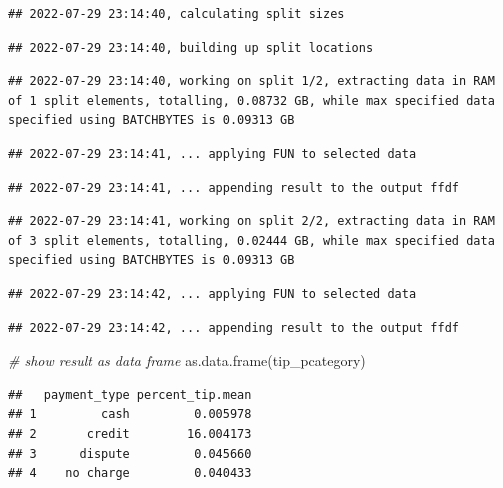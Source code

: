 \documentclass[
  12pt,
]{style/krantz}
\newenvironment{Shaded}{\begin{snugshade}}{\end{snugshade}}
\newcommand{\CommentTok}[1]{\textcolor[rgb]{0.56,0.35,0.01}{\textit{#1}}}
\newcommand{\FunctionTok}[1]{\textcolor[rgb]{0.00,0.00,0.00}{#1}}
\newcommand{\NormalTok}[1]{#1}
\begin{document}
\begin{verbatim}
## 2022-07-29 23:14:40, calculating split sizes
\end{verbatim}

\begin{verbatim}
## 2022-07-29 23:14:40, building up split locations
\end{verbatim}

\begin{verbatim}
## 2022-07-29 23:14:40, working on split 1/2, extracting data in RAM of 1 split elements, totalling, 0.08732 GB, while max specified data specified using BATCHBYTES is 0.09313 GB
\end{verbatim}

\begin{verbatim}
## 2022-07-29 23:14:41, ... applying FUN to selected data
\end{verbatim}

\begin{verbatim}
## 2022-07-29 23:14:41, ... appending result to the output ffdf
\end{verbatim}

\begin{verbatim}
## 2022-07-29 23:14:41, working on split 2/2, extracting data in RAM of 3 split elements, totalling, 0.02444 GB, while max specified data specified using BATCHBYTES is 0.09313 GB
\end{verbatim}

\begin{verbatim}
## 2022-07-29 23:14:42, ... applying FUN to selected data
\end{verbatim}

\begin{verbatim}
## 2022-07-29 23:14:42, ... appending result to the output ffdf
\end{verbatim}

\begin{Shaded}
\begin{Highlighting}[]
\CommentTok{\# show result as data frame}
\FunctionTok{as.data.frame}\NormalTok{(tip\_pcategory)}
\end{Highlighting}
\end{Shaded}

\begin{verbatim}
##   payment_type percent_tip.mean
## 1         cash         0.005978
## 2       credit        16.004173
## 3      dispute         0.045660
## 4    no charge         0.040433
\end{verbatim}
\end{document}
